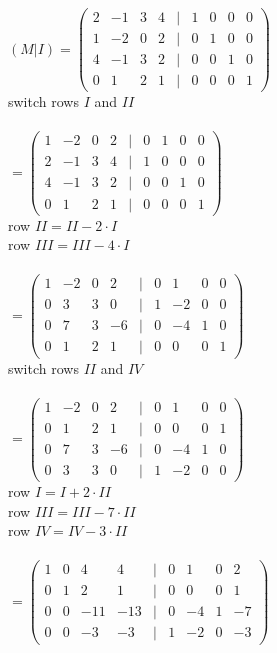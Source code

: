\noindent$
(M | I ) =
\begin{pmatrix}
2 & -1 & 3 & 4 & | & 1 & 0 & 0 & 0 \\
1 & -2 & 0 & 2 & | & 0 & 1 & 0 & 0 \\
4 & -1 & 3 & 2 & | & 0 & 0 & 1 & 0 \\
0 & 1 & 2 & 1 & | & 0 & 0 & 0 & 1
\end{pmatrix}$\\
switch rows $I$ and $II$\\\\
$=
\begin{pmatrix}
1 & -2 & 0 & 2 & | & 0 & 1 & 0 & 0 \\
2 & -1 & 3 & 4 & | & 1 & 0 & 0 & 0 \\
4 & -1 & 3 & 2 & | & 0 & 0 & 1 & 0 \\
0 & 1 & 2 & 1 & | & 0 & 0 & 0 & 1
\end{pmatrix}$\\
row $II = II - 2\cdot I$\\
row $III = III - 4 \cdot I$\\\\
$=
\begin{pmatrix}
1 & -2 & 0 & 2 & | & 0 & 1 & 0 & 0 \\
0 & 3 & 3 & 0 & | & 1 & -2 & 0 & 0 \\
0 & 7 & 3 & -6 & | & 0 & -4 & 1 & 0 \\
0 & 1 & 2 & 1 & | & 0 & 0 & 0 & 1
\end{pmatrix}$\\
switch rows $II$ and $IV$\\\\
$=
\begin{pmatrix}
1 & -2 & 0 & 2 & | & 0 & 1 & 0 & 0 \\
0 & 1 & 2 & 1 & | & 0 & 0 & 0 & 1 \\
0 & 7 & 3 & -6 & | & 0 & -4 & 1 & 0 \\
0 & 3 & 3 & 0 & | & 1 & -2 & 0 & 0
\end{pmatrix}$\\
row $I = I + 2\cdot II$\\
row $III = III - 7\cdot II$\\
row $IV = IV - 3 \cdot II$\\\\
$=
\begin{pmatrix}
1 & 0 & 4 & 4 & | & 0 & 1 & 0 & 2 \\
0 & 1 & 2 & 1 & | & 0 & 0 & 0 & 1 \\
0 & 0 & -11 & -13 & | & 0 & -4 & 1 & -7 \\
0 & 0 & -3 & -3 & | & 1 & -2 & 0 & -3
\end{pmatrix}$\\
